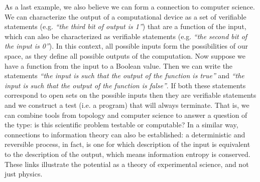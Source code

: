 \documentclass[%
reprint,
amsmath,amssymb,
aps,
prx,
]{revtex4-1}
\theoremstyle{plain}%
\theoremstyle{definition}
\theoremstyle{remark}
\newcommand{\statement}[1] {\emph{``#1''}}
\begin{document}
As a last example, we also believe we can form a connection to computer science. We can characterize the output of a computational device as a set of verifiable statements (e.g. \statement{the third bit of output is 1}) that are a function of the input, which can also be characterized as verifiable statements (e.g. \statement{the second bit of the input is 0}). In this context, all possible inputs form the possibilities of our space, as they define all possible outputs of the computation. Now suppose we have a function from the input to a Boolean value. Then we can write the statements \statement{the input is such that the output of the function is true} and \statement{the input is such that the output of the function is false}. If both these statements correspond to open sets on the possible inputs then they are verifiable statements and we construct a test (i.e. a program) that will always terminate. That is, we can combine tools from topology and computer science to answer a question of the type: is this scientific problem testable or computable? In a similar way, connections to information theory can also be established: a deterministic and reversible process, in fact, is one for which description of the input is equivalent to the description of the output, which means information entropy is conserved. These links illustrate the potential as a theory of experimental science, and not just physics.
\end{document}
